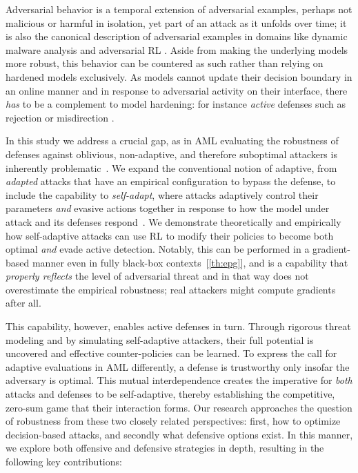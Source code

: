 Adversarial behavior is a temporal extension of adversarial examples, perhaps not malicious or harmful in isolation, yet part of an attack as it unfolds over time; it is also the canonical description of adversarial examples in domains like dynamic malware analysis and adversarial RL \cite{tsingenopoulos2022adaptive, gleave2020adversarial}.
Aside from making the underlying models more robust, this behavior can be countered as such rather than relying on hardened models exclusively.
As models cannot update their decision boundary in an online manner and in response to adversarial activity on their interface, there \emph{has} to be a complement to model hardening: for instance \emph{active} defenses such as rejection or misdirection \cite{barbero2022transcending, sengupta2020multi, chen2020stateful}.

In this study we address a crucial gap, as in \gls{AML} evaluating the robustness of defenses against oblivious, non-adaptive, and therefore suboptimal attackers is inherently problematic~\cite{tramer2020adaptive,croce2020reliable}.
We expand the conventional notion of adaptive, from \emph{adapted} attacks that have an empirical configuration to bypass the defense, to include the capability to \emph{self-adapt}, where attacks adaptively control their parameters \textit{and} evasive actions together in response to how the model under attack and its defenses respond~\cite{aastrom2013adaptive}.
We demonstrate theoretically and empirically how self-adaptive attacks can use \gls{RL} to modify their policies to become both optimal \emph{and} evade active detection.
Notably, this can be performed in a gradient-based manner even in fully black-box contexts~[\ref{th:epg}], and is a capability that \emph{properly reflects} the level of adversarial threat and in that way does not overestimate the empirical robustness; real attackers might compute gradients after all.

This capability, however, enables active defenses in turn.
Through rigorous threat modeling and by simulating self-adaptive attackers, their full potential is uncovered and effective counter-policies can be learned.
To express the call for adaptive evaluations in \gls{AML} differently, a defense is trustworthy only insofar the adversary is optimal.
This mutual interdependence creates the imperative for \emph{both} attacks and defenses to be self-adaptive, thereby establishing the competitive, zero-sum game that their interaction forms.
Our research approaches the question of robustness from these two closely related perspectives: first, how to optimize decision-based attacks, and secondly what defensive options exist.
In this manner, we explore both offensive and defensive strategies in depth, resulting in the following key contributions:

